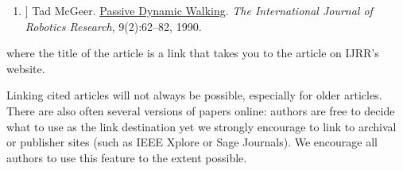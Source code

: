 \def\tmplabel#1{[#1]}

\begin{enumerate}
\item[\tmplabel{1}] Tad McGeer.
\href{http://ijr.sagepub.com/content/9/2/62.abstract}{Passive Dynamic Walking}.
{\em The International Journal of Robotics Research}, 9(2):62--82, 1990.
\end{enumerate}
%
where the title of the article is a link that takes you to the article on IJRR's website.


Linking cited articles will not always be possible, especially for older articles.
There are also often several versions of papers online: authors are free to decide what to use as the link destination yet we strongly encourage to link to archival or publisher sites (such as IEEE Xplore or Sage Journals).
We encourage all authors to use this feature to the extent possible.

